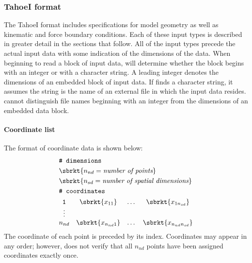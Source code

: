 \subsubsection{TahoeI format}
\label{sect.file.tahoeI}
The TahoeI format includes specifications for model geometry as well 
as kinematic and force boundary conditions. Each of these input types 
is described in greater detail in the sections that follow. All of the 
input types precede the actual input data with some indication of the 
dimensions of the data. When beginning to read a block of input data,
\tahoe will determine whether the block begins with an integer or
with a character string.
A leading integer denotes the dimensions of an embedded block of
input data. If \tahoe finds a character string, it assumes the string 
is the name of an external file in which the input data resides. 
\tahoe cannot distinguish file names beginning with an integer from 
the dimensions of an embedded data block.

\paragraph{Coordinate list}
\label{sect.TahoeI.coordinates}
The format of coordinate data is shown below:
\begin{align}
& \texttt{\# dimensions} \notag \\
& \sbrkt{n_{nd} = \textit{number of points}} \notag \\
& \sbrkt{n_{sd} = \textit{number of spatial dimensions}} \notag \\
& \texttt{\# coordinates} \notag \\
& \begin{matrix}
\texttt{1} & \sbrkt{x_{11}} & \dots  & \sbrkt{x_{1n_{sd}}} \\
\vdots \\
n_{nd} & \sbrkt{x_{n_{nd}1}} & \dots & \sbrkt{x_{n_{nd}n_{sd}}}
\end{matrix} \notag
\end{align}
The coordinate of each point is preceded by its index. Coordinates 
may appear in any order; however, \tahoe does not verify that all 
$n_{nd}$ points have been assigned coordinates exactly once.

